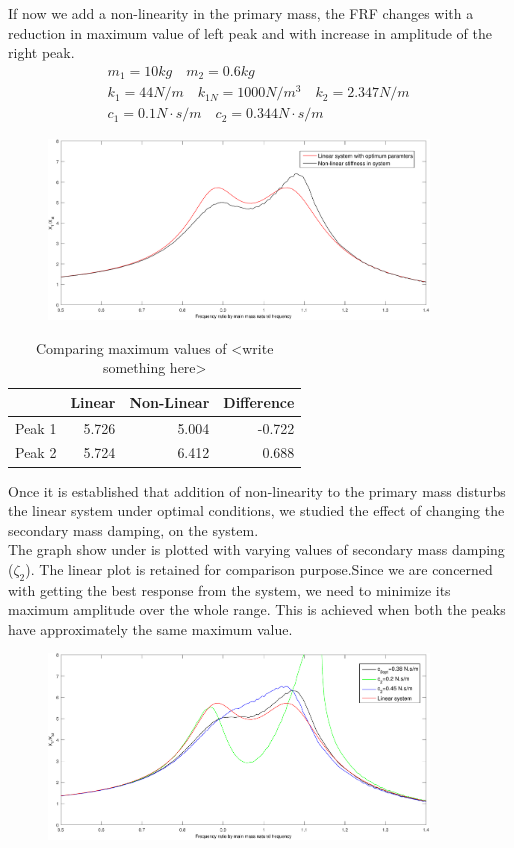 If now we add a non-linearity in the primary mass,
the FRF changes with a reduction in maximum value of left peak and with increase in amplitude of the right peak.
\begin{align*}
&m_1 = 10kg\quad m_2 = 0.6kg\quad \\
&k_1=44 N/m\quad
k_{1N} = 1000 N/m^3\quad k_2 = 2.347 N/m \quad \\
&c_1 = 0.1 N\cdot s/m \quad
c_2 = 0.344 N\cdot s/m 
\end{align*}
\begin{figure}[h!]
\includegraphics[width=0.9\textwidth]{"figures/nonlinear"}
\end{figure}
\begin{table}
\centering
\begin{tabular}{|r|r|r|r|}
\hline
 & Linear & Non-Linear & Difference \\ \hline
Peak 1 & 5.726 & 5.004 & -0.722\\
Peak 2 & 5.724  & 6.412 & 0.688\\ \hline
\end{tabular}
\caption{Comparing maximum values of <write something here> }
\end{table}
Once it is established that addition of non-linearity to the primary mass disturbs the linear system under optimal conditions, we studied the effect of changing the secondary mass damping, on the system.\\
The graph show under is plotted with varying values of secondary mass damping ($\zeta_2$). The linear plot is retained for comparison purpose.Since we are concerned with getting the best response from the system, we need to minimize its maximum amplitude over the whole range. This is achieved when both the peaks have approximately the same maximum value.\\[0.2in]
\begin{figure}[h!]
\includegraphics[width=0.9\textwidth]{"figures/change"}\\[0.2in] 
\end{figure}
